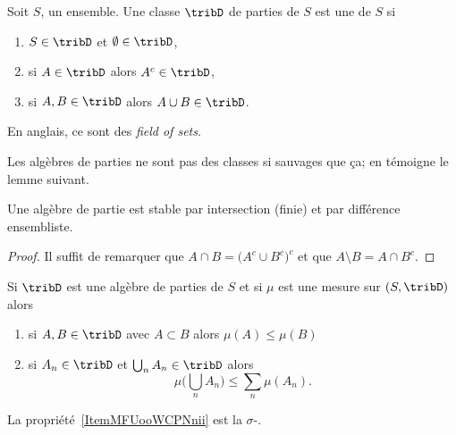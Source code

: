 \begin{definition}   \label{DefTCUoogGDud}
	Soit \( S\), un ensemble. Une classe \( \tribD\) de parties de \( S\) est une  de \( S\) si
	\begin{enumerate}
		\item
		      \( S\in\tribD\) et \( \emptyset\in\tribD\),
		\item
		      si \( A\in\tribD\) alors \( A^c\in\tribD\),
		\item
		      si \( A,B\in\tribD\) alors \( A\cup B\in\tribD\).
	\end{enumerate}
\end{definition}

\begin{normaltext}
	En anglais, ce sont des \emph{field of sets}\cite{BIBooNBGPooSPkEKX}.
\end{normaltext}

Les algèbres de parties ne sont pas des classes si sauvages que ça; en témoigne le lemme suivant.
\begin{lemma}   \label{LemBFKootqXKl}
	Une algèbre de partie est stable par intersection (finie) et par différence ensembliste.
\end{lemma}

\begin{proof}
	Il suffit de remarquer que \( A\cap B=\big( A^c\cup B^c \big)^c\) et que \( A\setminus B=A\cap B^c\).
\end{proof}

\begin{lemma}  \label{LemZQUooMdCpq}
	Si \( \tribD\) est une algèbre de parties de \( S\) et si \( \mu\) est une mesure sur \( (S,\tribD)\) alors
	\begin{enumerate}
		\item
		      si \( A,B\in\tribD\) avec \( A\subset B\) alors \( \mu(A)\leq \mu(B)\)
		\item   \label{ItemMFUooWCPNnii}
		      si \( A_n\in\tribD\) et \( \bigcup_nA_n\in\tribD\) alors
		      \begin{equation}
			      \mu\big( \bigcup_nA_n \big)\leq\sum_n\mu(A_n).
		      \end{equation}
	\end{enumerate}
\end{lemma}
La propriété~\ref{ItemMFUooWCPNnii} est la \( \sigma\)-.

